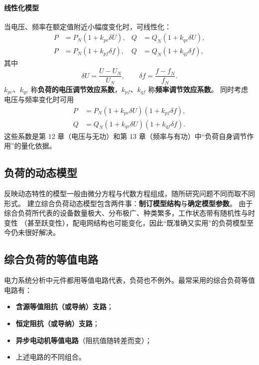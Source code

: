 \paragraph{线性化模型}
当电压、频率在额定值附近小幅度变化时，可线性化：
\begin{align}
  P&=P_N\left(1+k_{pv}\delta U\right),&
  Q&=Q_N\left(1+k_{qv}\delta U\right),\\
  P&=P_N\left(1+k_{pf}\delta f\right),&
  Q&=Q_N\left(1+k_{qf}\delta f\right),
\end{align}
其中
\begin{equation}
  \delta U=\frac{U-U_N}{U_N},\qquad \delta f=\frac{f-f_N}{f_N}.
\end{equation}
$k_{pv}$、$k_{qv}$ 称\textbf{负荷的电压调节效应系数}，$k_{pf}$、$k_{qf}$ 称\textbf{频率调节效应系数}。
同时考虑电压与频率变化时可用
\begin{align}
  P&=P_N\left(1+k_{pv}\delta U\right)\left(1+k_{pf}\delta f\right),\\
  Q&=Q_N\left(1+k_{qv}\delta U\right)\left(1+k_{qf}\delta f\right).
\end{align}
这些系数是第 12 章（电压与无功）和第 13 章（频率与有功）中“负荷自身调节作用”的量化依据。

\subsection{负荷的动态模型}

反映动态特性的模型一般由微分方程与代数方程组成，随所研究问题不同而取不同形式。
建立综合负荷动态模型包含两件事：\textbf{制订模型结构}与\textbf{确定模型参数}。
由于综合负荷所代表的设备数量极大、分布极广、种类繁多，工作状态带有随机性与时变性
（甚至跃变性），配电网结构也可能变化，因此“既准确又实用”的负荷模型至今仍未很好解决。

\subsection{综合负荷的等值电路}

电力系统分析中元件都用等值电路代表，负荷也不例外。最常采用的综合负荷等值电路有：
\begin{itemize}
  \item \textbf{含源等值阻抗（或导纳）支路}；
  \item \textbf{恒定阻抗（或导纳）支路}；
  \item \textbf{异步电动机等值电路}（阻抗值随转差而变）；
  \item 上述电路的不同组合。
\end{itemize}

